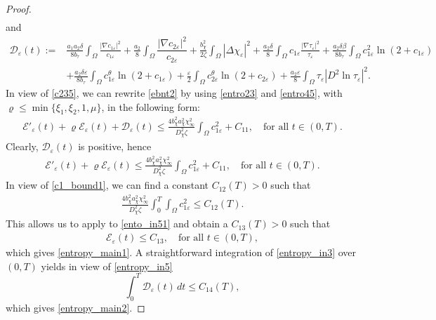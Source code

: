 \documentclass[a4paper,10pt]{article}
\theoremstyle{definition}
\begin{document}
\begin{proof}
\begin{align}
\end{align}
and
\begin{align}
    \label{entro45}
    \nonumber \mathcal{D}_\varepsilon(t) := & \frac{a_1 a_2 \delta}{8 b_\tau} \int_\Omega \frac{|\nabla c_{1\varepsilon}|^2}{c_{1\varepsilon}} + \frac{a_2}{8}  \int_\Omega \dfrac{|\nabla c_{2 \varepsilon}|^2}{c_{2\varepsilon}} + \frac{b_\chi^2}{2 \zeta} \int_\Omega |\Delta \chi_\varepsilon|^2 + \frac{a_2 \delta}{8} \int_\Omega c_{1\varepsilon} \frac{|\nabla \tau_\varepsilon|^2}{\tau_\varepsilon} + \frac{a_2 \delta \beta}{8 b_\tau} \int_\Omega c_{1\varepsilon}^2 \ln(2 + c_{1\varepsilon}) \\[5pt]
    & + \frac{a_2 \delta \varepsilon}{8 b_\tau} \int_\Omega c_{1\varepsilon}^\theta \ln(2 + c_{1\varepsilon}) + \frac{\varepsilon}{2} \int_\Omega c_{2\varepsilon}^\theta \ln(2 + c_{2\varepsilon}) +\frac{a_2 \varepsilon}{8} \int_\Omega \tau_\varepsilon |D^2 \ln \tau_\varepsilon|^2.
\end{align}
In view of \eqref{c235}, we can rewrite \eqref{ebnt2} by using \eqref{entro23} and \eqref{entro45}, with $\varrho \leq \min\{\xi_1, \xi_2, 1, \mu\}$, in the following form:
\begin{align}
\label{entropy_in3}
\mathcal{E}'_\varepsilon(t) + \varrho \mathcal{E}_\varepsilon(t) + \mathcal{D}_\varepsilon(t)
\leq \frac{4b_\chi^2 a_\chi^2 \chi_\infty^2}{D_\chi^2 \zeta} \int_\Omega c_{1\varepsilon}^2 + C_{11},
\quad \text{for all } t \in (0, T).
\end{align}
Clearly, $\mathcal{D}_\varepsilon(t)$ is positive, hence
\begin{align}
\label{ento_in51}
\mathcal{E}'_\varepsilon(t) + \varrho \mathcal{E}_\varepsilon(t)
\leq \frac{4b_\chi^2 a_\chi^2 \chi_\infty^2}{D_\chi^2 \zeta} \int_\Omega c_{1\varepsilon}^2 + C_{11},
\quad \text{for all } t \in (0, T).
\end{align}
In view of \eqref{c1_bound1}, we can find a constant $C_{12}(T) > 0$ such that
\begin{align*}
    \frac{4b_\chi^2 a_\chi^2 \chi_\infty^2}{D_\chi^2 \zeta} \int_0^T \int_\Omega c_{1\varepsilon}^2 \leq C_{12}(T).
\end{align*}
This allows us to apply \cite[Lemma 3.4]{stinner2014global} to \eqref{ento_in51} and obtain a $C_{13}(T) > 0$ such that
\begin{align}
\label{entropy_in5}
\mathcal{E}_\varepsilon(t) \leq C_{13}, \quad \text{for all } t \in (0, T),
\end{align}
which gives \eqref{entropy_main1}. A straightforward integration of \eqref{entropy_in3} over $(0, T)$ yields in view of \eqref{entropy_in5}
\begin{equation*}
\int_0^T \mathcal{D}_\varepsilon(t) \, dt \leq C_{14}(T),
\end{equation*}
which gives \eqref{entropy_main2}.
\end{proof}
\end{document}
